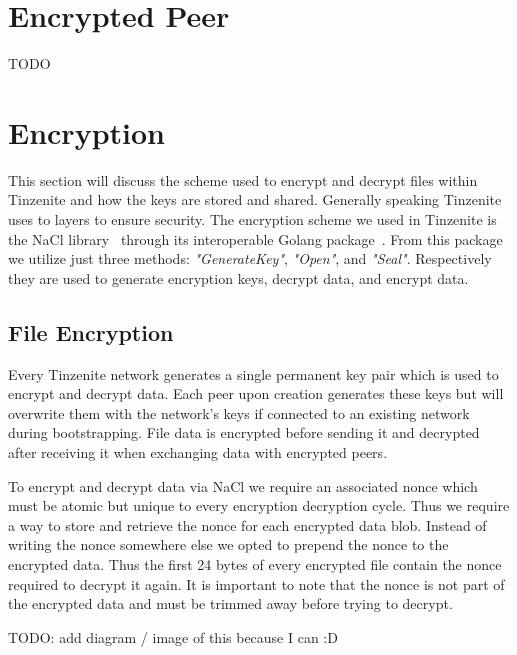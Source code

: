 \section{Encrypted Peer}

TODO

\section{Encryption}
\label{sec:Encryption}

This section will discuss the scheme used to encrypt and decrypt files within Tinzenite and how the keys are stored and shared.
Generally speaking Tinzenite uses to layers to ensure security.
The encryption scheme we used in Tinzenite is the NaCl library~\cite{bernstein2012security} through its interoperable Golang package~\cite{web:site:golang:box}.%
From this package we utilize just three methods: \textit{"GenerateKey"}, \textit{"Open"}, and \textit{"Seal"}.
Respectively they are used to generate encryption keys, decrypt data, and encrypt data.

\subsection{File Encryption}
\label{sub:File Encryption}

Every Tinzenite network generates a single permanent key pair which is used to encrypt and decrypt data.
Each peer upon creation generates these keys but will overwrite them with the network's keys if connected to an existing network during bootstrapping.
File data is encrypted before sending it and decrypted after receiving it when exchanging data with encrypted peers.

To encrypt and decrypt data via NaCl we require an associated nonce which must be atomic but unique to every encryption decryption cycle.
Thus we require a way to store and retrieve the nonce for each encrypted data blob.
Instead of writing the nonce somewhere else we opted to prepend the nonce to the encrypted data. %
Thus the first 24 bytes of every encrypted file contain the nonce required to decrypt it again.
It is important to note that the nonce is not part of the encrypted data and must be trimmed away before trying to decrypt.

TODO: add diagram / image of this because I can :D

